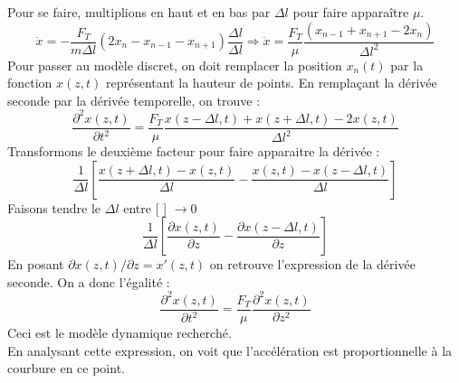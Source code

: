 \documentclass	[11pt, a4paper, openany]{book}
\begin{document}
Pour se faire, multiplions en haut et en bas par $\Delta l$ pour faire apparaître $\mu$.
\begin{equation}
\ddot{x} = -\frac{F_T}{m\Delta l}(2x_n - x_{n-1} - x_{n+1})\frac{\Delta l}{\Delta l} \Rightarrow \ddot{x} = \frac{F_T}{\mu}\frac{(x_{n-1} + x_{n+1} - 2x_n)}{\Delta l^2}
\end{equation}
Pour passer au modèle discret, on doit remplacer la position $x_n(t)$ par la fonction $x(z,t)$ représentant la hauteur de points. En remplaçant la dérivée seconde par la dérivée temporelle, on trouve : 
\begin{equation}
\frac{\partial^2 x(z, t)}{\partial t^2} = \frac{F_T}{\mu}\frac{x(z-\Delta l, t) + x(z+\Delta l, t) -2x(z, t)}{\Delta l^2}
\end{equation}
Transformons le deuxième facteur pour faire apparaitre la dérivée : 
\begin{equation}
\frac{1}{\Delta l}\left[\frac{x(z+\Delta l, t) - x(z, t)}{\Delta l} - \frac{x(z, t) - x(z-\Delta l, t)}{\Delta l}\right]
\end{equation}
Faisons tendre le $\Delta l$ entre [ ] $\rightarrow 0$
\begin{equation}
\frac{1}{\Delta l}\left[\frac{\partial x(z, t)}{\partial z} - \frac{\partial x(z -\Delta l, t)}{\partial z}\right]
\end{equation}
En posant $\partial x(z, t)/\partial z = x'(z, t)$ on retrouve l'expression de la dérivée seconde. On a donc l'égalité :
\begin{equation}
\frac{\partial^2 x(z, t)}{\partial t^2} = \frac{F_T}{\mu}\frac{\partial^2 x(z, t)}{\partial z^2}
\end{equation}
Ceci est le modèle dynamique recherché.\\
En analysant cette expression, on voit que l'accélération  est proportionnelle à la courbure en ce point.
\end{document}
